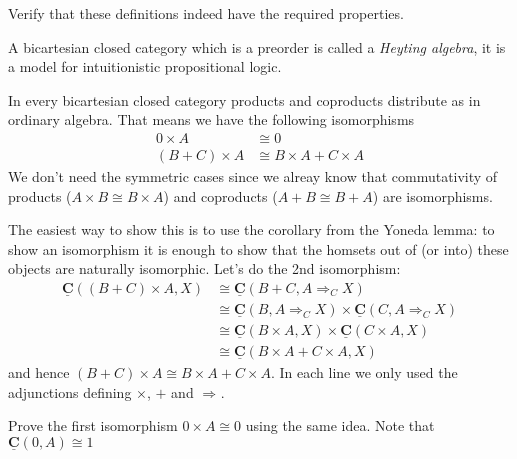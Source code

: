 \documentclass{article}
\newcommand{\cat}[1]{\underline{\mathbf{#1}}}
\newcommand{\homC}[3]{\cat{#1}(#2,#3)}
\newcommand{\expC}[3]{#2\Rightarrow_{#1} #3}
\begin{document}
\begin{Exercise}
Verify that these definitions indeed have the required properties.
\end{Exercise}
A bicartesian closed category which is a preorder is called a \emph{Heyting algebra}, it is a model for intuitionistic propositional logic.


In every bicartesian closed category products and coproducts distribute as in ordinary algebra. That means we have the following isomorphisms
\begin{align*}
  0 \times A & \cong 0 \\
  (B + C)\times A & \cong B\times A + C \times A
\end{align*}
We don't need the symmetric cases since we alreay know that commutativity of products ($A \times B \cong B \times A$) and coproducts ($A + B \cong B + A$) are isomorphisms.

The easiest way to show this is to use the corollary from the Yoneda lemma: to show an isomorphism it is enough to show that the homsets out of (or into) these objects are naturally isomorphic. Let's do the 2nd isomorphism: 
\begin{align*}
  \homC{C}{(B + C)\times A}{X} 
   & \cong \homC{C}{B+C}{\expC{C}{A}{X}} \\
  & \cong \homC{C}{B}{\expC{C}{A}{X}} \times \homC{C}{C}{\expC{C}{A}{X}} \\
   & \cong \homC{C}{B\times A}{X} \times \homC{C}{C\times A}{X} \\
   & \cong \homC{C}{B \times A + C \times A}{X}
\end{align*}
and hence $(B + C)\times A \cong B\times A + C \times A$.
In each line we only used the adjunctions defining $\times$, $+$ and $\expC{}{}{}$.
\begin{Exercise}
  Prove the first isomorphism $0 \times A \cong 0$ using the same idea. Note that $\homC{C}{0}{A} \cong 1$
\end{Exercise}
\end{document}
